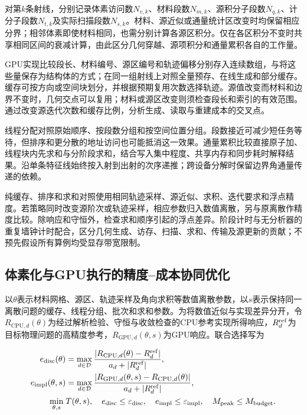 \documentclass[UTF8, zihao=-4, fontset=none, a4paper]{ctexart}
\begin{document}
对第\(k\)条射线，分别记录体素访问数\(N_{v,k}\)、材料段数\(N_{m,k}\)、源积分子段数\(N_{q,k}\)、计分子段数\(N_{t,k}\)及实际扫描段数\(N_{s,k}\)。材料、源近似或通量统计区改变时均保留相应分界；相邻体素即使材料相同，也需分别计算各源区积分。仅在各区积分不变时共享相同区间的衰减计算，由此区分几何穿越、源项积分和通量累积各自的工作量。

GPU实现比较段长、材料编号、源区编号和轨迹偏移分别存入连续数组，与将这些量保存为结构体的方式；在同一组射线上对照全量预存、在线生成和部分缓存。缓存可按方向或空间块划分，并根据预期复用次数选择轨迹。源值改变而材料和边界不变时，几何交点可以复用；材料或源区改变则须检查段长和索引的有效范围。通过改变源迭代次数和缓存比例，分析生成、读取与重建成本的交叉点。

线程分配对照原始顺序、按段数分组和按空间位置分组。段数接近可减少短任务等待，但排序和更分散的地址访问也可能抵消这一效果。通量累积比较直接原子加、线程块内先求和与分阶段求和，结合写入集中程度、共享内存和同步耗时解释结果。沿单条特征线始终按入射到出射的次序递推；跨设备分解时保留边界角通量传递的依赖。

纯缓存、排序和求和对照使用相同轨迹采样、源近似、求积、迭代要求和浮点精度。若策略同时改变源阶次或轨迹采样，相应参数归入数值离散，另与原离散作精度比较。除响应和守恒外，检查求和顺序引起的浮点差异。阶段计时与无分析器的重复墙钟计时配合，区分几何生成、访存、扫描、求和、传输及源更新的贡献；不预先假设所有算例均受显存带宽限制。

\subsection{体素化与GPU执行的精度--成本协同优化}

以\(\theta\)表示材料网格、源区、轨迹采样及角向求积等数值离散参数，以\(s\)表示保持同一离散问题的缓存、线程分组、批次和求和参数。为将数值近似与实现差异分开，令\(R_{\mathrm{CPU},d}(\theta)\)为经过解析检验、守恒与收敛检查的CPU参考实现所得响应，\(R_d^{\rm ref}\)为目标物理问题的高精度参考，\(R_{\mathrm{GPU},d}(\theta,s)\)为GPU响应。联合选择写为

\begin{equation}
\begin{aligned}
e_{\rm disc}(\theta)&=\max_{d\in\mathcal D}
 \frac{|R_{\mathrm{CPU},d}(\theta)-R_d^{\rm ref}|}{a_d+|R_d^{\rm ref}|},\\
e_{\rm impl}(\theta,s)&=\max_{d\in\mathcal D}
 \frac{|R_{\mathrm{GPU},d}(\theta,s)-R_{\mathrm{CPU},d}(\theta)|}{a_d+|R_d^{\rm ref}|},\\
\min_{\theta,s}\;&T(\theta,s),\quad
 e_{\rm disc}\leq\varepsilon_{\rm disc},\quad
 e_{\rm impl}\leq\varepsilon_{\rm impl},\quad
 M_{\rm peak}\leq M_{\rm budget}.
\end{aligned}
\label{eq:joint}
\end{equation}
\end{document}
